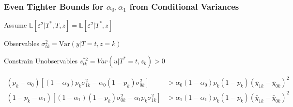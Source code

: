 \documentclass{beamer}
\begin{document}
%
%
%
%
%
%  
\begin{frame}
  \frametitle{Even Tighter Bounds for $\alpha_0, \alpha_1$ from Conditional Variances}
  \begin{block}{Assume}
    $\mathbb{E}[\varepsilon^2|T^*,T,z] = \mathbb{E}[\varepsilon^2|T^*,z]$
  \end{block}

  \begin{block}{Observables}
    $\sigma^2_{tk} = \mbox{Var}(y|T=t,z=k)$ 
  \end{block}

  \begin{block}{Constrain Unobservables}
    $s^{*2}_{tk} = Var(u|T^*=t, z_k) > 0$ 

    \footnotesize
\begin{align*}
  (p_k - \alpha_0) \left[ (1 - \alpha_0)p_k \sigma^2_{1k} - \alpha_0 (1 - p_k)\sigma_{0k}^2 \right] &> \alpha_0 (1 - \alpha_0)p_k (1 - p_k)(\bar{y}_{1k} - \bar{y}_{0k})^2\\
  (1 - p_k - \alpha_1) \left[ (1 - \alpha_1)(1 - p_k) \sigma^2_{0k} - \alpha_1 p_k\sigma_{1k}^2 \right] &> \alpha_1 (1 - \alpha_1)p_k (1 - p_k)(\bar{y}_{1k} - \bar{y}_{0k})^2
\end{align*}
  \end{block}
\end{frame}
\end{document}
